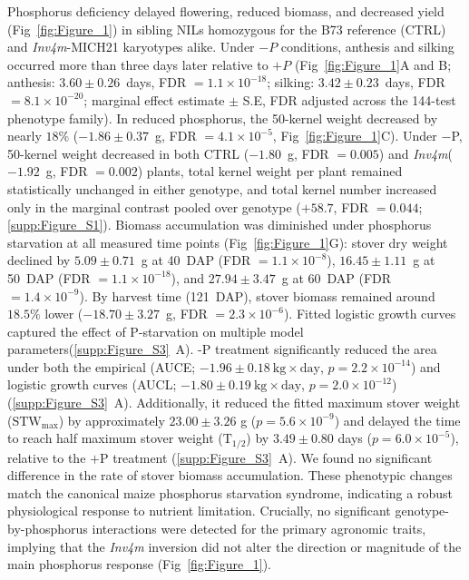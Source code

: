 \documentclass[9pt,twocolumn,twoside]{rilabRxiv}
\newcommand{\invfour}{\textit{Inv4m}\xspace}
\begin{document}
Phosphorus deficiency delayed flowering, reduced biomass, and decreased yield (Fig~\ref{fig:Figure_1}) in sibling NILs homozygous for the B73 reference (CTRL) and \invfour-MICH21 karyotypes alike.
Under $-P$ conditions, anthesis and silking occurred more than three days later relative to $+P$ (Fig~\ref{fig:Figure_1}A and B; anthesis: $3.60 \pm 0.26$~days, FDR $= 1.1 \times 10^{-18}$; silking: $3.42 \pm 0.23$~days, FDR $= 8.1 \times 10^{-20}$; marginal effect estimate $\pm$ S.E, FDR adjusted across the 144-test phenotype family).
In reduced phosphorus, the 50-kernel weight decreased by nearly $18\%$ ($-1.86 \pm 0.37$~g, FDR $= 4.1 \times 10^{-5}$, Fig~\ref{fig:Figure_1}C).
Under $-$P, 50-kernel weight decreased in both CTRL ($-1.80$~g, FDR $= 0.005$) and \invfour ($-1.92$~g, FDR $= 0.002$) plants, total kernel weight per plant remained statistically unchanged in either genotype, and total kernel number increased only in the marginal contrast pooled over genotype ($+58.7$, FDR $= 0.044$; \ref{supp:Figure_S1}).
Biomass accumulation was diminished under phosphorus starvation at all measured time points (Fig~\ref{fig:Figure_1}G): stover dry weight declined by $5.09 \pm 0.71$~g at 40~DAP (FDR $= 1.1 \times 10^{-8}$), $16.45 \pm 1.11$~g at 50~DAP (FDR $= 1.1 \times 10^{-18}$), and $27.94 \pm 3.47$~g at 60~DAP (FDR $= 1.4 \times 10^{-9}$).
By harvest time (121~DAP), stover biomass remained around $18.5\%$ lower ($-18.70 \pm 3.27$~g, FDR $= 2.3 \times 10^{-6}$).
Fitted logistic growth curves captured the effect of P-starvation on multiple model parameters(\ref{supp:Figure_S3}~A). 
-P treatment significantly reduced the area under both the empirical (AUCE; $-1.96 \pm 0.18~\text{kg} \times \text{day}$, $p=2.2 \times 10^{-14}$) and logistic growth curves (AUCL; $-1.80 \pm 0.19~\text{kg} \times \text{day}$, $p=2.0 \times 10^{-12}$) (\ref{supp:Figure_S3}~A). 
Additionally, it reduced the fitted maximum stover weight ($\text{STW}_{\text{max}}$) by approximately $23.00 \pm 3.26$ g ($p = 5.6 \times 10^{-9}$) and delayed the time to reach half maximum stover weight ($\text{T}_{1/2}$) by $3.49 \pm 0.80$ days ($p = 6.0 \times 10^{-5}$), relative to the $+\text{P}$ treatment (\ref{supp:Figure_S3}~A). 
We found no significant difference in the rate of stover biomass accumulation.
These phenotypic changes match the canonical maize phosphorus starvation syndrome, indicating a robust physiological response to nutrient limitation.
Crucially, no significant genotype-by-phosphorus interactions were detected for the primary agronomic traits, implying that the \invfour inversion did not alter the direction or magnitude of the main phosphorus response (Fig~\ref{fig:Figure_1}).
\end{document}
